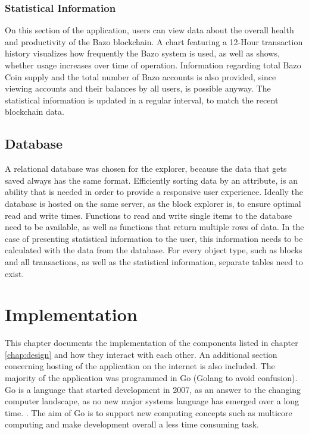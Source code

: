 \subsection{Statistical Information}
On this section of the application, users can view data about the overall health and productivity of the Bazo blockchain. A chart featuring a 12-Hour transaction history visualizes how frequently the Bazo system is used, as well as shows, whether usage increases over time of operation. Information regarding total Bazo Coin supply and the total number of Bazo accounts is also provided, since viewing accounts and their balances by all users, is possible anyway. The statistical information is updated in a regular interval, to match the recent blockchain data.

\section{Database}
A relational database was chosen for the explorer, because the data that gets saved always has the same format. Efficiently sorting data by an attribute, is an ability that is needed in order to provide a responsive user experience. Ideally the database is hosted on the same server, as the block explorer is, to ensure optimal read and write times. Functions to read and write single items to the database need to be available, as well as functions that return multiple rows of data. In the case of presenting statistical information to the user, this information needs to be calculated with the data from the database. For every object type, such as blocks and all transactions, as well as the statistical information, separate tables need to exist. 

\chapter{Implementation}
This chapter documents the implementation of the components listed in chapter \ref{chap:design} and how they interact with each other. An additional section concerning hosting of the application on the internet is also included. The majority of the application was programmed in Go (Golang to avoid confusion). Go is a language that started development in 2007, as an answer to the changing computer landscape, as no new major systems language has emerged over a long time. \cite{gohistory}. The aim of Go is to support new computing concepts such as multicore computing and make development overall a less time consuming task.
